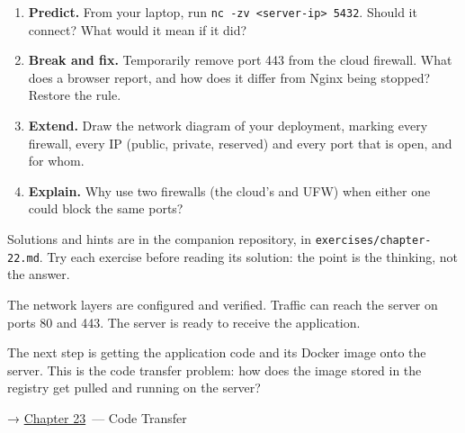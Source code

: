 \label{22-network-configuration:exercises}

\begin{enumerate}
\def\labelenumi{\arabic{enumi}.}
\tightlist
\item
  \textbf{Predict.} From your laptop, run \texttt{nc\ -zv\ \textless{}server-ip\textgreater{}\ 5432}. Should it connect? What would it mean if it did?
\item
  \textbf{Break and fix.} Temporarily remove port 443 from the cloud firewall. What does a browser report, and how does it differ from Nginx being stopped? Restore the rule.
\item
  \textbf{Extend.} Draw the network diagram of your deployment, marking every firewall, every IP (public, private, reserved) and every port that is open, and for whom.
\item
  \textbf{Explain.} Why use two firewalls (the cloud's and UFW) when either one could block the same ports?
\end{enumerate}

\noindent{}Solutions and hints are in the companion repository, in \texttt{exercises/}\allowbreak{}\texttt{chapter-22.md}. Try each exercise before reading its solution: the point is the thinking, not the answer.

\label{22-network-configuration:whats-next}

The network layers are configured and verified. Traffic can reach the server on ports 80 and 443. The server is ready to receive the application.

The next step is getting the application code and its Docker image onto the server. This is the code transfer problem: how does the image stored in the registry get pulled and running on the server?

\noindent{}→ \hyperref[ch:23-code-transfer]{Chapter 23}~--- Code Transfer
